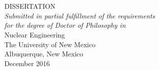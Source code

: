 \documentclass[11pt, oneside]{Thesis} %
\begin{document}
\begin{titlepage}
\begin{center}


{\huge \bfseries \ttitle}\\[0.4cm] %
 
\\[3cm]
\large DISSERTATION
\\[3cm]
 
\large \textit{Submitted in partial fulfillment of the requirements\\ 
for the degree of Doctor of Philosophy in}\\[0.3cm] %
Nuclear Engineering
\\[1cm] %
The University of New Mexico\\
Albuquerque, New Mexico
\\[2cm]
{\large December 2016}\\[4cm] %
 
\vfill
\end{center}

\end{titlepage}
\end{document}
